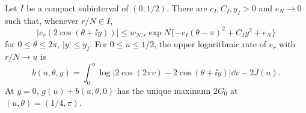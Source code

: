 \begin{lemma}\label{cs:low-strip}
Let \(I\) be a compact subinterval of \((0,1/2)\). There are
\(c_I,C_I,y_I>0\) and \(e_N\to0\) such that, whenever \(r/N\in I\),
\begin{equation}\label{cs:low-gaussian}
 |e_r(2\cos(\theta+\ii y))|
 \le w_{N,r}\exp N\{-c_I(\theta-\pi)^2+C_Iy^2+e_N\}
\end{equation}
for \(0\le\theta\le2\pi\), \(|y|\le y_I\).
For $0\le u\le1/2$, the upper logarithmic rate of $e_r$ with $r/N\to u$ is
\begin{equation}\label{cs:Newton-action}
 b(u,\theta,y)=\int_0^u
      \log|2\cos(2\pi v)-2\cos(\theta+\ii y)|\dd v-2J(u).
\end{equation}
At \(y=0\), \(g(u)+b(u,\theta,0)\) has the unique maximum
\(2G_0\) at \((u,\theta)=(1/4,\pi)\).
\end{lemma}
